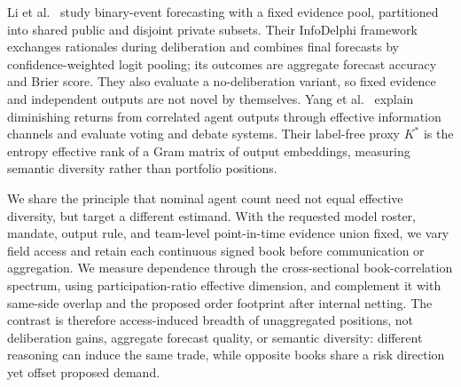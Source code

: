 Li et al.~\cite{li2026diverseevidence} study binary-event forecasting with a fixed evidence pool, partitioned into shared public and disjoint private subsets. Their InfoDelphi framework exchanges rationales during deliberation and combines final forecasts by confidence-weighted logit pooling; its outcomes are aggregate forecast accuracy and Brier score. They also evaluate a no-deliberation variant, so fixed evidence and independent outputs are not novel by themselves. Yang et al.~\cite{yang2026agentscaling} explain diminishing returns from correlated agent outputs through effective information channels and evaluate voting and debate systems. Their label-free proxy $K^*$ is the entropy effective rank of a Gram matrix of output embeddings, measuring semantic diversity rather than portfolio positions.

We share the principle that nominal agent count need not equal effective diversity, but target a different estimand. With the requested model roster, mandate, output rule, and team-level point-in-time evidence union fixed, we vary field access and retain each continuous signed book before communication or aggregation. We measure dependence through the cross-sectional book-correlation spectrum, using participation-ratio effective dimension, and complement it with same-side overlap and the proposed order footprint after internal netting. The contrast is therefore access-induced breadth of unaggregated positions, not deliberation gains, aggregate forecast quality, or semantic diversity: different reasoning can induce the same trade, while opposite books share a risk direction yet offset proposed demand.
